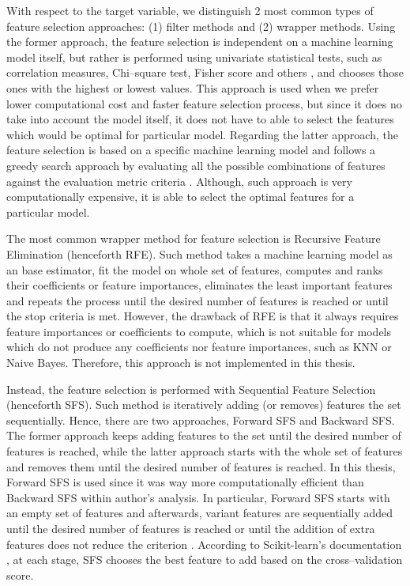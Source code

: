 With respect to the target variable, we distinguish 2 most common types of feature selection approaches: (1) filter methods and (2) wrapper methods.
Using the former approach, the feature selection is independent on a machine learning model itself, but rather is performed using univariate statistical tests, such as correlation measures, Chi--square test, Fisher score and others \citep{kaushik2016introduction}, and chooses those ones with the highest or lowest values.
This approach is used when we prefer lower computational cost and faster feature selection process, but since it does no take into account the model itself, it does not have to able to select the features which would be optimal for particular model.
Regarding the latter approach, the feature selection is based on a specific machine learning model and follows a greedy search approach by evaluating all the possible combinations of features against the evaluation metric criteria \citep{Verma2020}. Although, such approach is very computationally expensive, it is able to select the optimal features for a particular model.

The most common wrapper method for feature selection is Recursive Feature Elimination (henceforth RFE). Such method takes a machine learning model as an base estimator, fit the model on whole set of features, computes and ranks their coefficients or feature importances, eliminates the least important features and repeats the process until the desired number of features is reached \citep{Brownlee2020} or until the stop criteria is met.
However, the drawback of RFE is that it always requires feature importances or coefficients to compute, which is not suitable for models which do not produce any coefficients nor feature importances, such as KNN or Naive Bayes. Therefore, this approach is not implemented in this thesis.

Instead, the feature selection is performed with Sequential Feature Selection (henceforth SFS). Such method is iteratively adding (or removes) features the set sequentially. Hence, there are two approaches, Forward SFS and Backward SFS.
The former approach keeps adding features to the set until the desired number of features is reached, while the latter approach starts with the whole set of features and removes them until the desired number of features is reached.
In this thesis, Forward SFS is used since it was way more computationally efficient than Backward SFS within author's analysis. In particular, Forward SFS starts with an empty set of features and afterwards, variant features are sequentially added until the desired number of features is reached  or until the addition of extra features does not reduce the criterion \citep{Verma2021}. 
According to Scikit-learn's documentation \citep{sfs}, at each stage, SFS chooses the best feature to add based on the cross--validation score.

